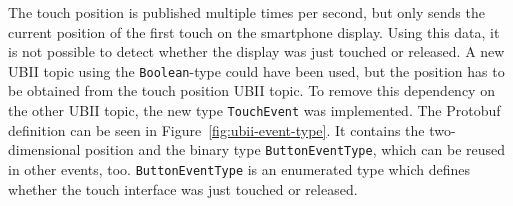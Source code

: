 The touch position is published multiple times per second, but only sends the current position of the first touch on the smartphone display. Using this data, it is not possible to detect whether the display was just touched or released. A new \ac{UBII} topic using the \lstinline{Boolean}-type could have been used, but the position has to be obtained from the touch position \ac{UBII} topic. To remove this dependency on the other \ac{UBII} topic, the new type \lstinline{TouchEvent} was implemented. The \ac{Protobuf} definition can be seen in Figure~\ref{fig:ubii-event-type}. It contains the two-dimensional position and the binary type \mbox{\lstinline{ButtonEventType},} which can be reused in other events, too. \lstinline{ButtonEventType} is an enumerated type which defines whether the touch interface was just touched or released.
